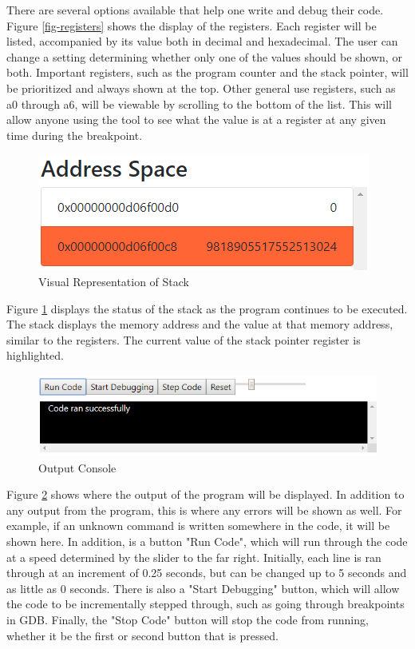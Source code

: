 There are several options available that help one write and debug their code.
%
Figure \ref{fig-registers} shows the display of the registers.
%
Each register will be listed, accompanied by its value both in decimal and hexadecimal.
%
The user can change a setting determining whether only one of the values should be shown, or both.
%
Important registers, such as the program counter and the stack pointer, will be prioritized and always shown at the top.
%
Other general use registers, such as a0 through a6, will be viewable by scrolling to the bottom of the list.
%
This will allow anyone using the tool to see what the value is at a register at any given time during the breakpoint.


\begin{figure}[!t]
    \centering
    \vspace{-4pt}
    \includegraphics[scale=0.80]{figures/fig-stack.png}
    \caption{Visual Representation of Stack}
    \label{fig-stack}
\end{figure}

Figure \ref{fig-stack} displays the status of the stack as the program continues to be executed.
%
The stack displays the memory address and the value at that memory address, similar to the registers.
%
The current value of the stack pointer register is highlighted.


\begin{figure}[!t]
    \centering
    \vspace{-4pt}
    \includegraphics[scale=0.55]{figures/fig-console.png}
    \caption{Output Console}
    \label{fig-console}
\end{figure}


Figure \ref{fig-console} shows where the output of the program will be displayed.
%
In addition to any output from the program, this is where any errors will be shown as well.
%
For example, if an unknown command is written somewhere in the code, it will be shown here.
%
In addition, is a button "Run Code", which will run through the code at a speed determined by the slider to the far right.
%
Initially, each line is ran through at an increment of 0.25 seconds, but can be changed up to 5 seconds and as little as 0 seconds.
%
There is also a "Start Debugging" button, which will allow the code to be incrementally stepped through, such as going through breakpoints in GDB.
%
Finally, the "Stop Code" button will stop the code from running, whether it be the first or second button that is pressed.


